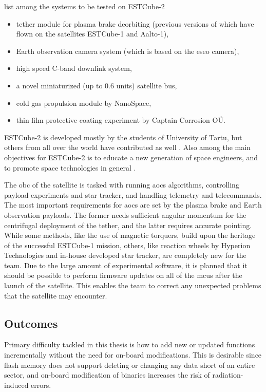 \textcite{Iakubivskyi2016} list among the systems to be tested on ESTCube-2
\begin{itemize}
  \item tether module for plasma brake deorbiting (previous versions of which have flown on the satellites ESTCube-1 and Aalto-1),
  \item Earth observation camera system (which is based on the \gls{eseo} camera),
  \item high speed C-band downlink system,
  \item a novel miniaturized (up to 0.6 units) satellite bus,
  \item cold gas propulsion module by NanoSpace,
  \item thin film protective coating experiment by Captain Corrosion OÜ.
\end{itemize}

ESTCube-2 is developed mostly by the students of University of Tartu, but others from all over the world have contributed as well \cite{Ehrpais2016}. Also among the main objectives for ESTCube-2 is to educate a new generation of space engineers, and to promote space technologies in general \cite{Iakubivskyi2016}.

The \gls{obc} of the satellite is tasked with running \gls{aocs} algorithms, controlling payload experiments and star tracker, and handling telemetry and telecommands. The most important requirements for \gls{aocs} are set by the plasma brake and Earth observation payloads. The former needs sufficient angular momentum for the centrifugal deployment of the tether, and the latter requires accurate pointing. While some methods, like the use of magnetic torquers, build upon the heritage of the successful ESTCube-1 mission, others, like reaction wheels by Hyperion Technologies and in-house developed star tracker, are completely new for the team. Due to the large amount of experimental software, it is planned that it should be possible to perform firmware updates on all of the \glspl{mcu} after the launch of the satellite. This enables the team to correct any unexpected problems that the satellite may encounter. \cite{Ehrpais2016}


\subsection{Outcomes}

Primary difficulty tackled in this thesis is how to add new or updated functions incrementally without the need for on-board modifications. This is desirable since flash memory does not support deleting or changing any data short of an entire sector, and on-board modification of binaries increases the risk of radiation-induced errors.

